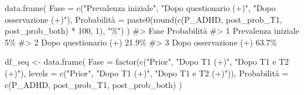 \documentclass[
  italian,
  letterpaper,
  a4paper,
  11pt,
  open=any]{scrbook}
\newenvironment{Shaded}{\begin{snugshade}}{\end{snugshade}}
\newcommand{\AttributeTok}[1]{\textcolor[rgb]{0.40,0.45,0.13}{#1}}
\newcommand{\CommentTok}[1]{\textcolor[rgb]{0.37,0.37,0.37}{#1}}
\newcommand{\DecValTok}[1]{\textcolor[rgb]{0.68,0.00,0.00}{#1}}
\newcommand{\FunctionTok}[1]{\textcolor[rgb]{0.28,0.35,0.67}{#1}}
\newcommand{\NormalTok}[1]{\textcolor[rgb]{0.00,0.23,0.31}{#1}}
\newcommand{\OtherTok}[1]{\textcolor[rgb]{0.00,0.23,0.31}{#1}}
\newcommand{\SpecialCharTok}[1]{\textcolor[rgb]{0.37,0.37,0.37}{#1}}
\newcommand{\StringTok}[1]{\textcolor[rgb]{0.13,0.47,0.30}{#1}}
\theoremstyle{plain}
\theoremstyle{definition}
\theoremstyle{definition}
\theoremstyle{remark}
\begin{document}
\begin{tcolorbox}
\begin{Shaded}
\begin{Highlighting}[]
\FunctionTok{data.frame}\NormalTok{(}
  \AttributeTok{Fase =} \FunctionTok{c}\NormalTok{(}\StringTok{"Prevalenza iniziale"}\NormalTok{, }
           \StringTok{"Dopo questionario (+)"}\NormalTok{, }
           \StringTok{"Dopo osservazione (+)"}\NormalTok{),}
\NormalTok{  Probabilità }\OtherTok{=} \FunctionTok{paste0}\NormalTok{(}\FunctionTok{round}\NormalTok{(}\FunctionTok{c}\NormalTok{(P\_ADHD, post\_prob\_T1, post\_prob\_both) }\SpecialCharTok{*} \DecValTok{100}\NormalTok{, }\DecValTok{1}\NormalTok{), }\StringTok{"\%"}\NormalTok{)}
\NormalTok{)}
\CommentTok{\#\textgreater{}                    Fase Probabilità}
\CommentTok{\#\textgreater{} 1   Prevalenza iniziale          5\%}
\CommentTok{\#\textgreater{} 2 Dopo questionario (+)       21.9\%}
\CommentTok{\#\textgreater{} 3 Dopo osservazione (+)       63.7\%}
\end{Highlighting}
\end{Shaded}

\begin{Shaded}
\begin{Highlighting}[]
\NormalTok{df\_seq }\OtherTok{\textless{}{-}} \FunctionTok{data.frame}\NormalTok{(}
  \AttributeTok{Fase =} \FunctionTok{factor}\NormalTok{(}\FunctionTok{c}\NormalTok{(}\StringTok{"Prior"}\NormalTok{, }\StringTok{"Dopo T1 (+)"}\NormalTok{, }\StringTok{"Dopo T1 e T2 (+)"}\NormalTok{),}
                \AttributeTok{levels =} \FunctionTok{c}\NormalTok{(}\StringTok{"Prior"}\NormalTok{, }\StringTok{"Dopo T1 (+)"}\NormalTok{, }\StringTok{"Dopo T1 e T2 (+)"}\NormalTok{)),}
\NormalTok{  Probabilità }\OtherTok{=} \FunctionTok{c}\NormalTok{(P\_ADHD, post\_prob\_T1, post\_prob\_both)}
\NormalTok{)}


\end{Highlighting}
\end{Shaded}
\end{tcolorbox}
\end{document}
